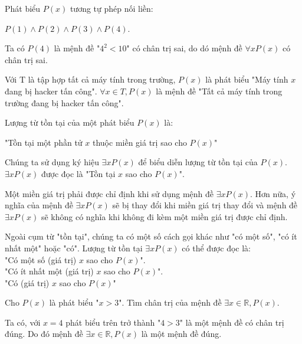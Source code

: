 \documentclass[11pt,fleqn]{book} %
\begin{document}
        Phát biểu $P(x)$ tương tự phép nối liền:
        \begin{center}
            $P(1) \land P(2) \land P(3) \land P(4)$.
        \end{center}
        Ta có $P(4)$ là mệnh đề "$4^2 < 10$" có chân trị sai, do dó mệnh đề $\forall x P(x)$ có chân trị sai.
        
        \begin{example}
            Với T là tập hợp tất cả máy tính trong trường, $P(x)$ là phát biểu "Máy tính $x$ đang bị hacker tấn công". $\forall x \in T, P(x)$ là mệnh đề "Tất cả máy tính trong trường đang bị hacker tấn công".
        \end{example}
        
        \begin{definition}
            Lượng từ tồn tại của một phát biểu $P(x)$ là:
            \begin{center}
                "Tồn tại một phần tử $x$ thuộc miền giá trị sao cho $P(x)$"
            \end{center}
            Chúng ta sử dụng ký hiệu $\exists x P(x)$ để biểu diễn lượng từ tồn tại của $P(x)$. $\exists x P(x)$ được đọc là "Tồn tại $x$ sao cho $P(x)$".
        \end{definition}
        
        Một miền giá trị phải được chỉ định khi sử dụng mệnh đề $\exists x P(x)$. Hơn nữa, ý nghĩa của mệnh đề $\exists x P(x)$ sẽ bị thay đổi khi miền giá trị thay đổi và mệnh đề $\exists x P(x)$ sẽ không có nghĩa khi không đi kèm một miền giá trị được chỉ định.
        
        Ngoài cụm từ "tồn tại", chúng ta có một số cách gọi khác như "có một số", "có ít nhất một" hoặc "có". Lượng từ tồn tại $\exists x P(x)$ có thể được đọc là:\\
        "Có một số (giá trị) $x$ sao cho $P(x)$".\\
        "Có ít nhất một (giá trị) $x$ sao cho $P(x)$".\\
        "Có (giá trị) $x$ sao cho $P(x)$"
        
        \begin{example}
            Cho $P(x)$ là phát biểu "$x > 3$". Tìm chân trị của mệnh đề $\exists x \in \mathbb{R}, P(x)$.
        \end{example}
        
        Ta có, với $x = 4$ phát biểu trên trở thành "$4 > 3$" là một mệnh đề có chân trị đúng. Do đó mệnh đề $\exists x \in \mathbb{R}, P(x)$ là một mệnh đề đúng.
        
\end{document}
